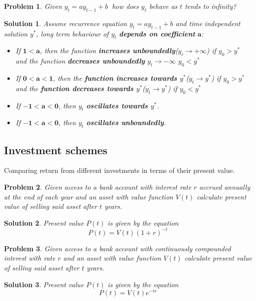 \documentclass[11pt,a4paper]{article}
\theoremstyle{break}
\newtheorem*{problem}{Problem}
\theoremstyle{break}
\newtheorem*{solution}{Solution}
\begin{document}
\begin{problem}
Given $ y_{t} = ay_{t-1} + b\ $ how does $y_{t}$ behave as $t$ tends to infinity?
\end{problem}

\begin{solution}
Assume recurrence equation $y_{t} = ay_{t-1} + b$ and time independent solution $y^{\ast}$, long term behaviour of $y_{t}$ \textbf{depends on coefficient} $\mathbf{a}$:
\begin{itemize}
\item If $\mathbf{1 < a}$, then the function \textbf{increases unboundedly}($y_{t} \rightarrow +\infty$) if $y_{0} > y^{\ast}$ and the function \textbf{decreases unboundedly} $y_{t} \rightarrow -\infty$ $y_{0} < y^{\ast}$
\item If $\mathbf{0 < a < 1}$, then the \textbf{function increases towards $y^{\ast}$}($y_{t} \rightarrow y^{\ast}$) if $y_{0} > y^{\ast}$ and the \textbf{function decreases towards $y^{\ast}$}($y_{t} \rightarrow y^{\ast}$) if $y_{0} < y^{\ast}$
\item If $\mathbf{-1 < a < 0}$, then $y_{t}$ \textbf{oscillates towards $y^{\ast}$}.
\item If $\mathbf{-1 < a < 0}$, then $y_{t}$ \textbf{oscillates unboundedly}.
\end{itemize}
\end{solution}

\subsection{Investment schemes}
Comparing return from different investments in terms of their present value.

\begin{problem}
Given access to a bank account with interest rate $r$ accrued annually at the end of each year and an asset with value function $V(t)$ calculate present value of selling said asset after $t$ years.
\end{problem}

\begin{solution}
Present value $P(t)$ is given by the equation \[ P(t) = V(t)(1+r)^{-t} \]
\end{solution}

\begin{problem}
Given access to a bank account with continuously compounded interest with rate $r$ and an asset with value function $V(t)$ calculate present value of selling said asset after $t$ years.
\end{problem}

\begin{solution}
Present value $P(t)$ is given by the equation \[ P(t) = V(t)e^{-tr} \]
\end{solution}
\end{document}
